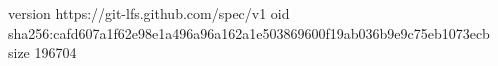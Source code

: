 version https://git-lfs.github.com/spec/v1
oid sha256:cafd607a1f62e98e1a496a96a162a1e503869600f19ab036b9e9c75eb1073ecb
size 196704
